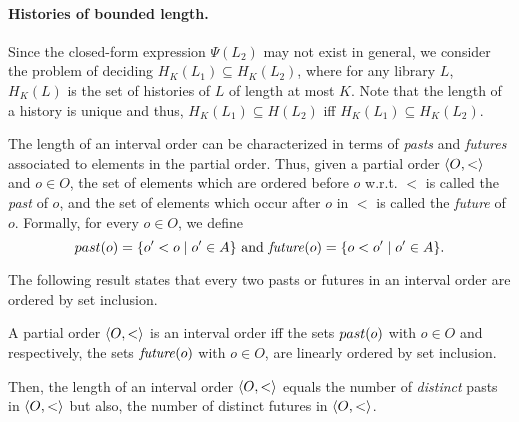 \paragraph{Histories of bounded length.}
Since the closed-form expression $\Psi(L_2)$ may not exist in general, we consider the problem of deciding
$H_K(L_1) \subseteq H_K(L_2)$, where for any library $L$, $H_K(L)$ is the set of histories of $L$ of length at most $K$.
Note that the length of a history is unique and thus, $H_K(L_1) \subseteq H(L_2)$ iff $H_K(L_1) \subseteq H_K(L_2)$.

The length of an interval order can be characterized 
in terms of \emph{pasts} and \emph{futures} associated to elements in the partial order.
Thus, given a partial order $\left\langle {O,<} \right\rangle$ and $o\in O$, the set of elements which
are ordered before $o$ w.r.t. $<$ is called the \emph{past} of $o$, and the set
of elements which occur after $o$ in $<$ is called the \emph{future} of $o$.
Formally, for every $o\in O$, we define
\[
past({o})=\{o' < o\mid o'\in A\}\mbox{ and }\mathit{future}({o})=\{o < o'\mid o'\in A\}.
\]


The following result states that every two pasts or futures in an interval
order are ordered by set inclusion.

\begin{lemma}

  A partial order $\left\langle {O,<} \right\rangle$ is an interval order iff the sets $past({o})$ with $o\in O$ and respectively,  the sets $\mathit{future}({o})$
  with $o\in O$, are
  linearly ordered by set inclusion. 

\end{lemma}

Then, the length of an interval order $\left\langle {O,<} \right\rangle$ equals the number of \emph{distinct} pasts in $\left\langle {O,<} \right\rangle$ but also,
the number of distinct futures in $\left\langle {O,<} \right\rangle$.

